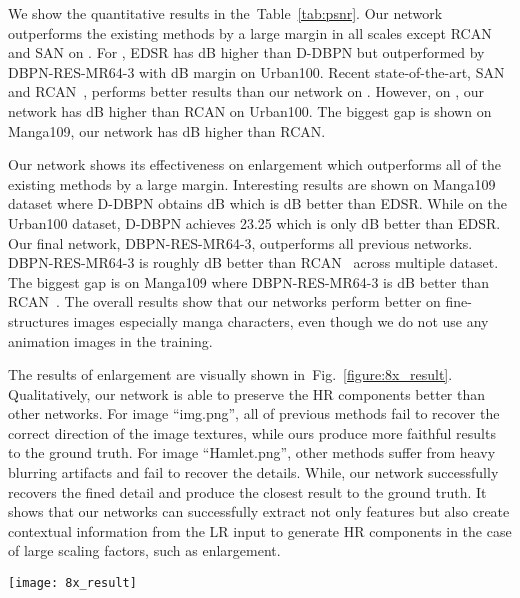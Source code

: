 \documentclass[10pt,journal,compsoc]{IEEEtran}
\begin{document}
We show the quantitative results in the~Table~\ref{tab:psnr}. Our network outperforms the existing methods by a large margin in all scales except RCAN and SAN on . 
For , EDSR has  dB higher than D-DBPN but outperformed by DBPN-RES-MR64-3 with  dB margin on Urban100. Recent state-of-the-art, SAN~\cite{dai2019second} and RCAN~\cite{zhang2018image}, performs better results than our network on . 
However, on , our network has  dB higher than RCAN on Urban100. The biggest gap is shown on Manga109, our network has  dB higher than RCAN.

Our network shows its effectiveness on  enlargement which outperforms all of the existing methods by a large margin. Interesting results are shown on Manga109 dataset where D-DBPN obtains  dB which is  dB better than EDSR. 
While on the Urban100 dataset, D-DBPN achieves 23.25 which is only  dB better than EDSR. 
Our final network, DBPN-RES-MR64-3, outperforms all previous networks. 
DBPN-RES-MR64-3 is roughly  dB better than RCAN~\cite{zhang2018image} across multiple dataset. The biggest gap is on Manga109 where DBPN-RES-MR64-3 is  dB better than RCAN~\cite{zhang2018image}.
The overall results show that our networks perform better on fine-structures images especially manga characters, even though we do not use any animation images in the training.

The results of  enlargement are visually shown in~Fig.~\ref{figure:8x_result}. Qualitatively, our network is able to preserve the HR components better than other networks. 
For image ``img.png'', all of previous methods fail to recover the correct direction of the image textures, while ours produce more faithful results to the ground truth.
For image ``Hamlet.png'', other methods suffer from heavy blurring artifacts and fail to recover the details. While, our network successfully recovers the fined detail and produce the closest result to the ground truth.
It shows that our networks can successfully extract not only features but also create contextual information from the LR input to generate HR components in the case of large scaling factors, such as  enlargement.



\begin{figure*}[t!]
\centering
\texttt{[image: 8x\_result]}
\caption{Qualitative comparison of our models with other works on  super-resolution.}
\label{figure:8x_result}
\end{figure*}
\end{document}
